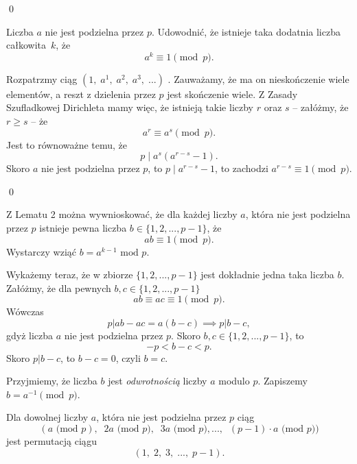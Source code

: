 \qed

\vspace{10px}


\noindent
Liczba $a$ nie jest podzielna przez $p$. Udowodnić, że istnieje taka dodatnia liczba całkowita~$k$, że 
\[
   a^k\equiv 1 \pmod{p}.
\]



\noindent
Rozpatrzmy ciąg $(1,\; a^1,\; a^2,\; a^3,\; ...)$ . Zauważamy, że ma on nieskończenie wiele elementów, a reszt z dzielenia przez $p$ jest skończenie wiele. Z Zasady Szufladkowej Dirichleta mamy więc, że istnieją takie liczby $r$ oraz $s$ -- załóżmy, że $r\geqslant s $ -- że 
\[
    a^r\equiv a^s \pmod{p}.
\]
Jest to równoważne temu, że 
\[  
    p\mid a^s(a^{r-s}-1).
\]
Skoro $a$ nie jest podzielna przez $p$, to $p\mid a^{r-s}-1$, to zachodzi $a^{r-s}\equiv 1 \pmod{p}$.

\qed


\vspace{10 px}

\noindent
Z Lematu 2 można wywnioskować, że dla każdej liczby $a$, która nie jest podzielna przez $p$ istnieje pewna liczba $b \in \{1, 2, ..., p-1\}$, że
\[
    ab \equiv 1 \pmod{p}.
\]
Wystarczy wziąć $b = a^{k - 1} \text{ mod } p$. 

Wykażemy teraz, że w zbiorze $\{1, 2, ..., p-1\}$ jest dokładnie jedna taka liczba $b$. Załóżmy, że dla pewnych $b, c \in \{1, 2, ..., p-1\}$
\[
    ab \equiv  ac \equiv 1 \pmod{p}.
\]
Wówczas
\[
    p \big| ab - ac = a(b - c) \implies p \big|b - c,
\]
gdyż liczba $a$ nie jest podzielna przez $p$. Skoro $b, c \in \{1, 2, ..., p-1\}$, to 
\[
    - p < b - c < p.
\]
Skoro $p \big| b - c$, to $b - c = 0$, czyli $b = c$.

\vspace{10px}

\noindent
Przyjmiemy, że liczba $b$ jest \textit{odwrotnością} liczby $a$ modulo $p$. Zapiszemy $b = a^{-1} \pmod{p}$.

\vspace{10px}


\noindent
Dla dowolnej liczby $a$, która nie jest podzielna przez $p$ ciąg
\[
    (a \text{ (mod } p),\;\; 2a \text{ (mod } p),\;\;  3a \text{ (mod } p), ...,\;\;  (p - 1) \cdot a \text{ (mod } p))
\]
jest permutacją ciągu
\[
 (1,\; 2,\; 3,\; ...,\; p - 1).
\]

